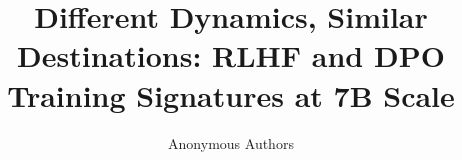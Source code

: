 \title{Different Dynamics, Similar Destinations: RLHF and DPO Training Signatures at 7B Scale}

\author{Anonymous Authors}

\maketitle
